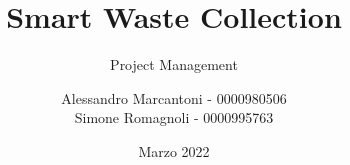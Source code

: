 \title{Smart Waste Collection}
\subtitle{Project Management}
\author{Alessandro Marcantoni - 0000980506\\
Simone Romagnoli - 0000995763}
\date{Marzo 2022}
